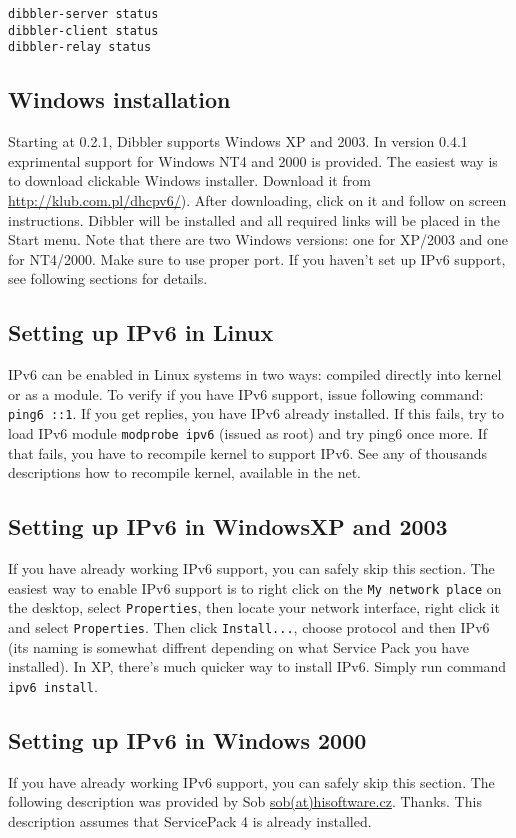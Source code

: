 \begin{verbatim}
dibbler-server status
dibbler-client status
dibbler-relay status
\end{verbatim}


\subsection{Windows installation}
Starting at 0.2.1, Dibbler supports Windows XP and 2003. In version
0.4.1 exprimental support for Windows NT4 and 2000 is provided. The easiest
way is to download clickable Windows installer. Download it from
\url{http://klub.com.pl/dhcpv6/}). After downloading, click on it and
follow on screen instructions. Dibbler will be installed and all
required links will be placed in the Start menu. Note that there are
two Windows versions: one for XP/2003 and one for NT4/2000. Make sure
to use proper port. If you haven't set up IPv6 support, see following
sections for details.

\subsection{Setting up IPv6 in Linux}
IPv6 can be enabled in Linux systems in two ways: compiled directly
into kernel or as a module. To verify if you have IPv6 support, issue
following command: \verb+ping6 ::1+. If you get replies, you have IPv6
already installed. If this fails, try to load IPv6 module
\verb+modprobe ipv6+ (issued as root) and try ping6 once more. If that
fails, you have to recompile kernel to support IPv6. See any of
thousands descriptions how to recompile kernel, available in the net.

\subsection{Setting up IPv6 in WindowsXP and 2003}
If you have already working IPv6 support, you can safely skip this section.
The easiest way to enable IPv6 support is to right click on the
\verb+My network place+ on the desktop, select \verb+Properties+, then locate
your network interface, right click it and select \verb+Properties+. Then
click \verb+Install...+, choose protocol and then IPv6 (its naming is
somewhat diffrent depending on what Service Pack you have installed).
In XP, there's much quicker way to install IPv6. Simply run command
\verb+ipv6 install+.

\subsection{Setting up IPv6 in Windows 2000}
If you have already working IPv6 support, you can safely skip this
section. The following description was provided by Sob 
\href{mailto:sob(at)hisoftware.cz}{sob(at)hisoftware.cz}. Thanks. This
description assumes that ServicePack 4 is already installed.

